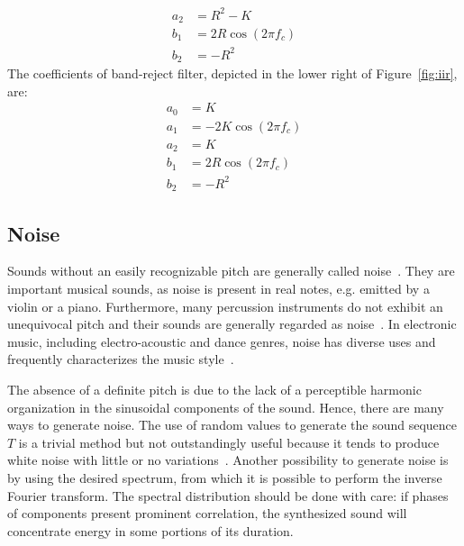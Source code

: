 \begin{enumerate}
\begin{equation}
\begin{split}
 a_2 & =  R^2-K \\
 b_1 & =  2R \cos (2\pi f_c) \\
 b_2 & =  -R^2
 \end{split}
\end{equation}
The coefficients of band-reject filter, depicted in the lower right of Figure~\ref{fig:iir}, are:
\begin{equation}\label{eq:rejeita-banda}
 \begin{split}
 a_0 & =  K \\
 a_1 & =  -2K\cos (2\pi f_c) \\
 a_2 & =  K \\
 b_1 & =  2R \cos (2\pi f_c) \\
 b_2 & =  -R^2
\end{split}
\end{equation}
\end{enumerate}

\subsection{Noise}\label{subsec:ruidos}
Sounds without an easily recognizable pitch are generally called noise~\cite{Lacerda}. They are important musical sounds, as noise is present in real notes, e.g. emitted by a violin or a piano. Furthermore, many percussion instruments do not exhibit an unequivocal pitch and their sounds are generally regarded as noise~\cite{Roederer}. In electronic music, including electro-acoustic and dance genres, noise has diverse uses and frequently characterizes the music style~\cite{Cook}. 

The absence of a definite pitch is due to the lack of a perceptible harmonic organization in the sinusoidal components of the sound.
Hence, there are many ways to generate noise. The use of random values to generate the sound sequence $T$ is a trivial method but not outstandingly useful because it tends to produce white noise with little or no variations~\cite{Cook}. Another possibility to generate noise is by using the desired spectrum, from which it is possible to perform the inverse Fourier transform. The spectral distribution should be done with care: if phases of components present prominent correlation, the synthesized sound will concentrate energy in some portions of its duration.

